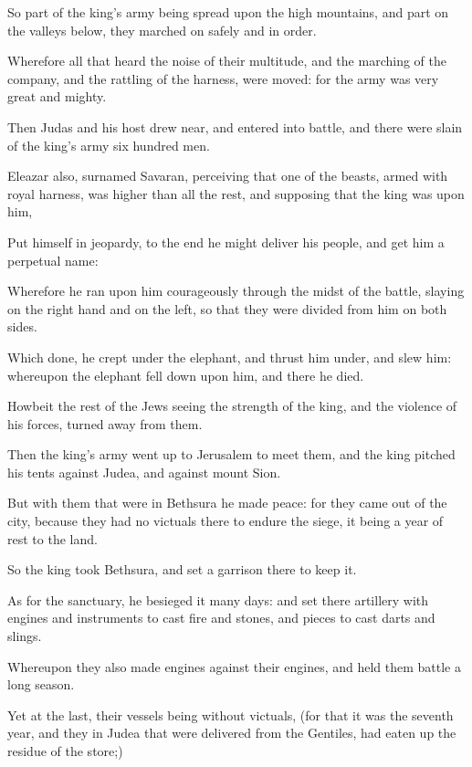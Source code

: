 {\par }{\PP {}So part of the king’s army being spread upon the high mountains, and part on the valleys below, they marched on safely and in order.
\par }{\PP {}Wherefore all that heard the noise of their multitude, and the marching of the company, and the rattling of the harness, were moved: for the army was very great and mighty.
\par }{\PP {}Then Judas and his host drew near, and entered into battle, and there were slain of the king’s army six hundred men.
\par }{\PP {}Eleazar also, surnamed Savaran, perceiving that one of the beasts, armed with royal harness, was higher than all the rest, and supposing that the king was upon him,
\par }{\PP {}Put himself in jeopardy, to the end he might deliver his people, and get him a perpetual name:
\par }{\PP {}Wherefore he ran upon him courageously through the midst of the battle, slaying on the right hand and on the left, so that they were divided from him on both sides.
\par }{\PP {}Which done, he crept under the elephant, and thrust him under, and slew him: whereupon the elephant fell down upon him, and there he died.
\par }{\PP {}Howbeit the rest of the Jews seeing the strength of the king, and the violence of his forces, turned away from them.
\par }{\PP {}Then the king’s army went up to Jerusalem to meet them, and the king pitched his tents against Judea, and against mount Sion.
\par }{\PP {}But with them that were in Bethsura he made peace: for they came out of the city, because they had no victuals there to endure the siege, it being a year of rest to the land.
\par }{\PP {}So the king took Bethsura, and set a garrison there to keep it.
\par }{\PP {}As for the sanctuary, he besieged it many days: and set there artillery with engines and instruments to cast fire and stones, and pieces to cast darts and slings.
\par }{\PP {}Whereupon they also made engines against their engines, and held them battle a long season.
\par }{\PP {}Yet at the last, their vessels being without victuals, (for that it was the seventh year, and they in Judea that were delivered from the Gentiles, had eaten up the residue of the store;)
}
